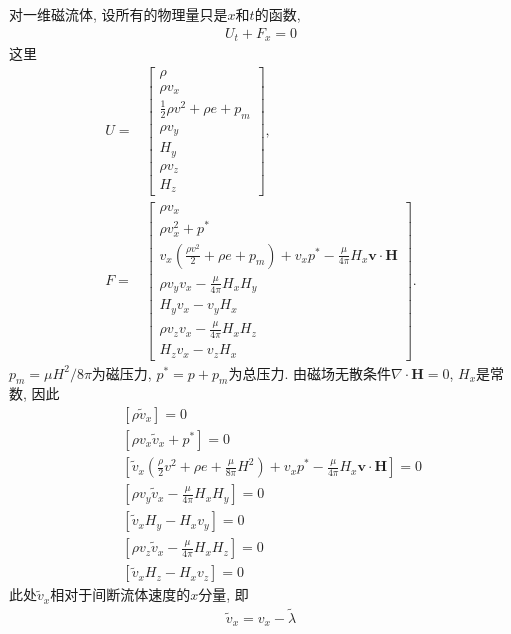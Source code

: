 \documentclass[10.5pt
]{article}
\begin{document}
对一维磁流体, 设所有的物理量只是$x$和$t$的函数,
\begin{align}
U_t + F_x = 0\label{Eqn:6.1.1}
\end{align}
这里
\begin{align}
U =& \left[\begin{array}{c}
\rho \\
\rho v_x \\
\frac{1}{2} \rho v^2 + \rho e + p_m \\
\rho v_y \\
H_y \\
\rho v_z \\
H_z
\end{array}\right], \label{Eqn:6.1.2a}
\\
F =& \left[\begin{array}{l}
\rho v_x \\
\rho v_x^2 + p^* \\
v_x \left( \frac{\rho v^2}{2} + \rho e + p_m \right) + v_x p^* - \frac{\mu}{4\pi} H_x \boldsymbol{v} \cdot \boldsymbol{H} \\
\rho v_y v_x - \frac{\mu}{4\pi} H_x H_y \\
H_y v_x - v_y H_x \\
\rho v_z v_x - \frac{\mu}{4\pi} H_x H_z \\
H_z v_x - v_z H_x
\end{array}\right]. \label{Eqn:6.1.2b}
\end{align}
$p_m = \mu H^2/8\pi$为磁压力, $p^* = p + p_m$为总压力. 由磁场无散条件$\nabla \cdot \boldsymbol{H} = 0$, $H_x$是常数, 因此
\begin{align}
& & \left[ \rho \tilde v_x \right] = 0
\\
& & \left[ \rho v_x \tilde v_x + p^* \right] = 0
\\
& & \left[\tilde v_x \left( \frac{\rho}{2} v^2 + \rho e + \frac{\mu}{8\pi} H^2 \right) +
v_x p^* -
\frac{\mu}{4\pi} H_x \boldsymbol{v} \cdot \boldsymbol{H} \right] = 0 \label{Eqn:6.1.6}
\\
& & \left[ \rho v_y \tilde v_x - \frac{\mu}{4\pi} H_x H_y \right] = 0
\\
& & \left[ \tilde v_x H_y - H_x v_y \right] = 0 \label{Eqn:6.1.8}
\\
& & \left[ \rho v_z \tilde v_x - \frac{\mu}{4\pi} H_x H_z \right] = 0
\\
& & \left[ \tilde v_x H_z - H_x v_z \right] = 0 \label{Eqn:6.1.10}
\end{align}
此处$\tilde v_x$相对于间断流体速度的$x$分量, 即
\begin{align}
\tilde v_x = v_x - \tilde\lambda
\end{align}
\end{document}
